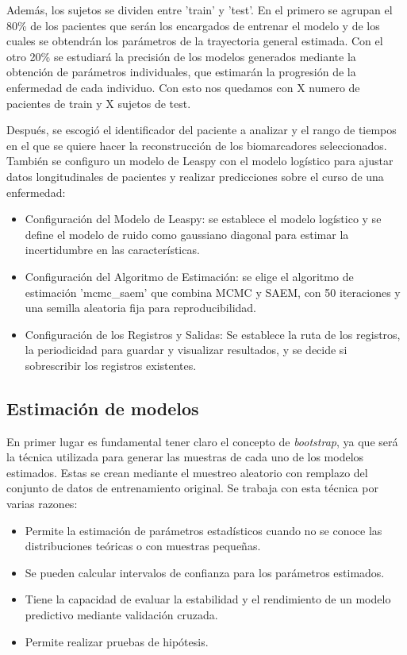 Además, los sujetos se dividen entre 'train' y 'test'. En el primero se agrupan el 80\% de los pacientes que serán los encargados de entrenar el modelo y de los cuales se obtendrán los parámetros de la trayectoria general estimada. Con el otro 20\% se estudiará la precisión de los modelos generados mediante la obtención de parámetros individuales, que estimarán la progresión de la enfermedad de cada individuo. Con esto nos quedamos con X numero de pacientes de train y X sujetos de test.

Después, se escogió el identificador del paciente a analizar y el rango de tiempos en el que se quiere hacer la reconstrucción de los biomarcadores seleccionados. También se configuro un modelo de Leaspy con el modelo logístico para ajustar datos longitudinales de pacientes y realizar predicciones sobre el curso de una enfermedad:
\begin{itemize}
	\item Configuración del Modelo de Leaspy: se establece el modelo logístico y se define el modelo de ruido como gaussiano diagonal para estimar la incertidumbre en las características.
	\item Configuración del Algoritmo de Estimación: se elige el algoritmo de estimación 'mcmc\_saem' que combina MCMC y SAEM, con 50 iteraciones y una semilla aleatoria fija para reproducibilidad.
	\item Configuración de los Registros y Salidas: Se establece la ruta de los registros, la periodicidad para guardar y visualizar resultados, y se decide si sobrescribir los registros existentes.
\end{itemize}

\subsection{Estimación de modelos}
En primer lugar es fundamental tener claro el concepto de \textit{bootstrap}, ya que será la técnica utilizada para generar las muestras de cada uno de los modelos estimados. Estas se crean mediante el muestreo aleatorio con remplazo del conjunto de datos de entrenamiento original. Se trabaja con esta técnica por varias razones:
\begin{itemize}
	\item Permite la estimación de parámetros estadísticos cuando no se conoce las distribuciones teóricas o con muestras pequeñas.
	\item Se pueden calcular intervalos de confianza para los parámetros estimados.
	\item Tiene la capacidad de evaluar la estabilidad y el rendimiento de un modelo predictivo mediante validación cruzada.
	\item Permite realizar pruebas de hipótesis.
\end{itemize}

